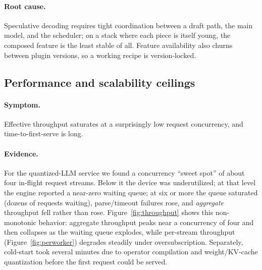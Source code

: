 \documentclass{article}
\begin{document}
\paragraph{Root cause.} Speculative decoding requires tight coordination between a
draft path, the main model, and the scheduler; on a stack where each piece is
itself young, the composed feature is the least stable of all. Feature
availability also churns between plugin versions, so a working recipe is
version-locked.

\subsection{Performance and scalability ceilings}
\label{sec:perf}
\paragraph{Symptom.} Effective throughput saturates at a surprisingly low request
concurrency, and time-to-first-serve is long.

\paragraph{Evidence.} For the quantized-LLM service we found a concurrency ``sweet
spot'' of about four in-flight request streams. Below it the device was
underutilized; at that level the engine reported a near-zero waiting queue; at six
or more the queue saturated (dozens of requests waiting), parse/timeout failures
rose, and \emph{aggregate} throughput fell rather than rose.
Figure~\ref{fig:throughput} shows this non-monotonic behavior: aggregate
throughput peaks near a concurrency of four and then collapses as the waiting
queue explodes, while per-stream throughput
(Figure~\ref{fig:perworker}) degrades steadily under oversubscription.
Separately, cold-start took several minutes due to operator compilation and
weight/KV-cache quantization before the first request could be served.
\end{document}
